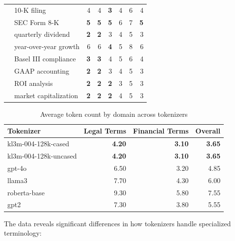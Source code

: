 \begin{table}[ht]
\begin{tabular}{@{}llrrrrrr@{}}
 & 10-K filing & 4 & 4 & \textbf{3} & 4 & 6 & 4 \\
 & SEC Form 8-K & \textbf{5} & \textbf{5} & \textbf{5} & 6 & 7 & \textbf{5} \\
 & quarterly dividend & \textbf{2} & \textbf{2} & 3 & 4 & 5 & 3 \\
 & year-over-year growth & 6 & 6 & \textbf{4} & 5 & 8 & 6 \\
 & Basel III compliance & \textbf{3} & \textbf{3} & 4 & 5 & 6 & 4 \\
 & GAAP accounting & \textbf{2} & \textbf{2} & 3 & 4 & 5 & 3 \\
 & ROI analysis & \textbf{2} & \textbf{2} & \textbf{2} & 3 & 5 & 3 \\
 & market capitalization & \textbf{2} & \textbf{2} & \textbf{2} & 4 & 5 & 3 \\
\bottomrule
\end{tabular}
\end{table}

\begin{table}[ht]
\centering
\caption{Average token count by domain across tokenizers}
\label{tab:domain-term-aggregate}
\begin{tabular}{lrrr}
\toprule
Tokenizer & Legal Terms & Financial Terms & Overall \\
\midrule
kl3m\mbox{-}004\mbox{-}128k\mbox{-}cased & \textbf{4.20} & \textbf{3.10} & \textbf{3.65} \\
kl3m\mbox{-}004\mbox{-}128k\mbox{-}uncased & \textbf{4.20} & \textbf{3.10} & \textbf{3.65} \\
gpt\mbox{-}4o & 6.50 & 3.20 & 4.85 \\
llama3 & 7.70 & 4.30 & 6.00 \\
roberta\mbox{-}base & 9.30 & 5.80 & 7.55 \\
gpt2 & 7.30 & 3.80 & 5.55 \\
\bottomrule
\end{tabular}
\end{table}

The data reveals significant differences in how tokenizers handle specialized terminology:

